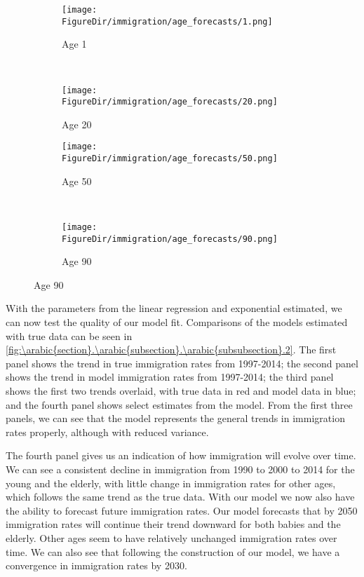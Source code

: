 \documentclass[10pt]{article}
\renewcommand{\thesection}{\arabic{section}}
\renewcommand{\thesubsection}{\thesection.\arabic{subsection}}
\renewcommand{\thesubsubsection}{\thesubsection.\arabic{subsubsection}}
\numberwithin{equation}{subsection}
\newcommand*{\FigureDir}{../../graphs}
\begin{document}
\begin{figure}[!ht]
   \centering
   \caption{\label{fig:\thesubsubsection.1}Immigration Estimated by Linear Regression and Forecasted by Exponential}
   \begin{subfigure}{0.5\textwidth}
      \centering
      \texttt{[image: \\FigureDir/immigration/age\_forecasts/1.png]}
      \caption{Age 1}
   \end{subfigure}%
   ~ %
   \begin{subfigure}{0.5\textwidth}
      \centering
      \texttt{[image: \\FigureDir/immigration/age\_forecasts/20.png]}
      \caption{Age 20}
   \end{subfigure}%
   \newline
   \begin{subfigure}{0.5\textwidth}
      \centering
      \texttt{[image: \\FigureDir/immigration/age\_forecasts/50.png]}
      \caption{Age 50}
   \end{subfigure}%
   ~ %
   \begin{subfigure}{0.5\textwidth}
      \centering
      \texttt{[image: \\FigureDir/immigration/age\_forecasts/90.png]}
      \caption{Age 90}
   \end{subfigure}%
\end{figure}

\par With the parameters from the linear regression and exponential estimated, we can now test the quality of our model fit. Comparisons of the models estimated with true data can be seen in \autoref{fig:\thesubsubsection.2}. The first panel shows the trend in true immigration rates from 1997-2014; the second panel shows the trend in model immigration rates from 1997-2014; the third panel shows the first two trends overlaid, with true data in red and model data in blue; and the fourth panel shows select estimates from the model. From the first three panels, we can see that the model represents the general trends in immigration rates properly, although with reduced variance. 

\par The fourth panel gives us an indication of how immigration will evolve over time. We can see a consistent decline in immigration from 1990 to 2000 to 2014 for the young and the elderly, with little change in immigration rates for other ages, which follows the same trend as the true data. With our model we now also have the ability to forecast future immigration rates. Our model forecasts that by 2050 immigration rates will continue their trend downward for both babies and the elderly. Other ages seem to have relatively unchanged immigration rates over time. We can also see that following the construction of our model, we have a convergence in immigration rates by 2030.
\end{document}
